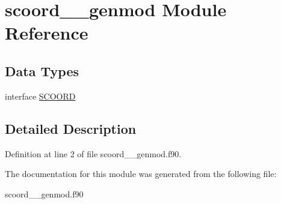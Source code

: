 \hypertarget{classscoord____genmod}{\section{scoord\+\_\+\+\_\+genmod Module Reference}
\label{classscoord____genmod}
}
\subsection*{Data Types}
\begin{DoxyCompactItemize}
\item 
interface \hyperlink{interfacescoord____genmod_1_1_s_c_o_o_r_d}{S\+C\+O\+O\+R\+D}
\end{DoxyCompactItemize}


\subsection{Detailed Description}


Definition at line 2 of file scoord\+\_\+\+\_\+genmod.\+f90.



The documentation for this module was generated from the following file\+:\begin{DoxyCompactItemize}
\item 
scoord\+\_\+\+\_\+genmod.\+f90\end{DoxyCompactItemize}
